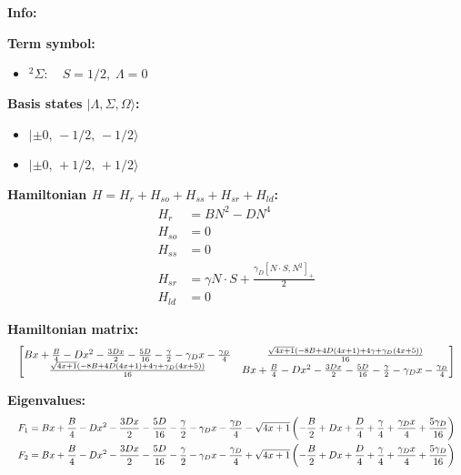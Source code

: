 \documentclass[12pt,fleqn]{article}
\begin{document}
\pagestyle{empty}

\textbf{Info:}

\textbf{Term symbol:}
\begin{itemize}
\item $^2\Sigma:\quad S=1/2,\;$
\end{itemize}

\textbf{Basis states $\lvert \Lambda,\Sigma,\Omega\rangle$:}
\begin{itemize}
\item $\lvert {},\,-1/2,\,-1/2\rangle$
\item $\lvert {},\,+1/2,\,+1/2\rangle$
\end{itemize}

\textbf{Hamiltonian $H = H_r + H_{so} + H_{ss} + H_{sr} + H_{ld}$:}
\begin{equation*}
\begin{aligned}
H_r &= B N^{2} - D N^{4} \\
H_{so} &= 0 \\
H_{ss} &= 0 \\
H_{sr} &= \gamma N \cdot S + \frac{\gamma_{D} \left[N \cdot S, N^{2}\right]_+}{2} \\
H_{ld} &= 0
\end{aligned}
\end{equation*}

\textbf{Hamiltonian matrix:}
\begin{equation*}
\resizebox{\linewidth}{!}{$
\left[\begin{matrix}B x + \frac{B}{4} - D x^{2} - \frac{3 D x}{2} - \frac{5 D}{16} - \frac{\gamma}{2} - \gamma_{D} x - \frac{\gamma_{D}}{4} & \frac{\sqrt{4 x + 1} \left(- 8 B + 4 D \left(4 x + 1\right) + 4 \gamma + \gamma_{D} \left(4 x + 5\right)\right)}{16}\\\frac{\sqrt{4 x + 1} \left(- 8 B + 4 D \left(4 x + 1\right) + 4 \gamma + \gamma_{D} \left(4 x + 5\right)\right)}{16} & B x + \frac{B}{4} - D x^{2} - \frac{3 D x}{2} - \frac{5 D}{16} - \frac{\gamma}{2} - \gamma_{D} x - \frac{\gamma_{D}}{4}\end{matrix}\right]
$}
\end{equation*}

\textbf{Eigenvalues:}
\begin{equation*}
\resizebox{\linewidth}{!}{$
\begin{aligned}
F_{1} &= B x + \frac{B}{4} - D x^{2} - \frac{3 D x}{2} - \frac{5 D}{16} - \frac{\gamma}{2} - \gamma_{D} x - \frac{\gamma_{D}}{4} - \sqrt{4 x + 1} \left(- \frac{B}{2} + D x + \frac{D}{4} + \frac{\gamma}{4} + \frac{\gamma_{D} x}{4} + \frac{5 \gamma_{D}}{16}\right) \\
F_{2} &= B x + \frac{B}{4} - D x^{2} - \frac{3 D x}{2} - \frac{5 D}{16} - \frac{\gamma}{2} - \gamma_{D} x - \frac{\gamma_{D}}{4} + \sqrt{4 x + 1} \left(- \frac{B}{2} + D x + \frac{D}{4} + \frac{\gamma}{4} + \frac{\gamma_{D} x}{4} + \frac{5 \gamma_{D}}{16}\right) \\
\end{aligned}
$}
\end{equation*}
\end{document}

